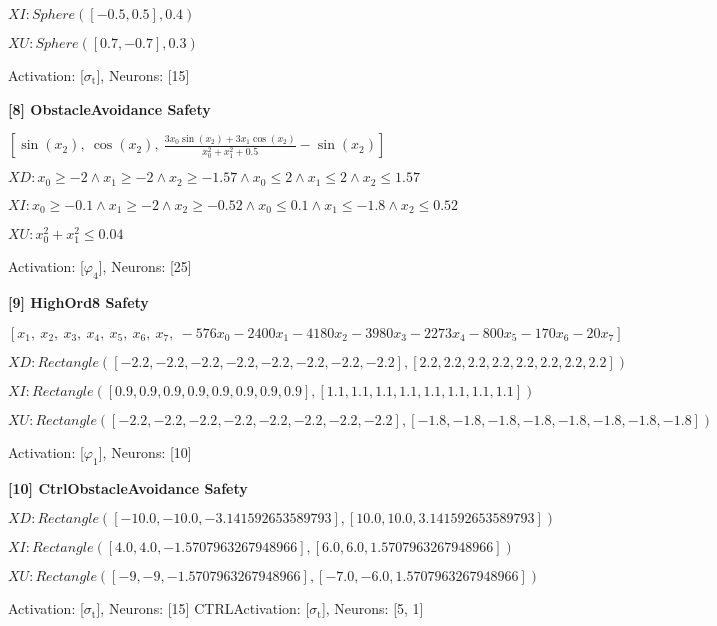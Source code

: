 $XI: Sphere([-0.5, 0.5], 0.4) $

$XU: Sphere([0.7, -0.7], 0.3) $


Activation: [$\sigma_{\mathrm{t}}$], Neurons: [15]

\textbf{ [8] ObstacleAvoidance Safety }

$\left[ \sin{\left(x_{2} \right)}, \  \cos{\left(x_{2} \right)}, \  \frac{3 x_{0} \sin{\left(x_{2} \right)} + 3 x_{1} \cos{\left(x_{2} \right)}}{x_{0}^{2} + x_{1}^{2} + 0.5} - \sin{\left(x_{2} \right)}\right]$ 
 
 $XD: x_{0} \geq -2 \wedge x_{1} \geq -2 \wedge x_{2} \geq -1.57 \wedge x_{0} \leq 2 \wedge x_{1} \leq 2 \wedge x_{2} \leq 1.57 $

$XI: x_{0} \geq -0.1 \wedge x_{1} \geq -2 \wedge x_{2} \geq -0.52 \wedge x_{0} \leq 0.1 \wedge x_{1} \leq -1.8 \wedge x_{2} \leq 0.52 $

$XU: x_{0}^{2} + x_{1}^{2} \leq 0.04 $


Activation: [$\varphi_{4}$], Neurons: [25]

\textbf{ [9] HighOrd8 Safety }

$\left[ x_{1}, \  x_{2}, \  x_{3}, \  x_{4}, \  x_{5}, \  x_{6}, \  x_{7}, \  - 576 x_{0} - 2400 x_{1} - 4180 x_{2} - 3980 x_{3} - 2273 x_{4} - 800 x_{5} - 170 x_{6} - 20 x_{7}\right]$ 
 
 $XD: Rectangle([-2.2, -2.2, -2.2, -2.2, -2.2, -2.2, -2.2, -2.2], [2.2, 2.2, 2.2, 2.2, 2.2, 2.2, 2.2, 2.2]) $

$XI: Rectangle([0.9, 0.9, 0.9, 0.9, 0.9, 0.9, 0.9, 0.9], [1.1, 1.1, 1.1, 1.1, 1.1, 1.1, 1.1, 1.1]) $

$XU: Rectangle([-2.2, -2.2, -2.2, -2.2, -2.2, -2.2, -2.2, -2.2], [-1.8, -1.8, -1.8, -1.8, -1.8, -1.8, -1.8, -1.8]) $


Activation: [$\varphi_{1}$], Neurons: [10]

\textbf{ [10] CtrlObstacleAvoidance Safety }

 
 $XD: Rectangle([-10.0, -10.0, -3.141592653589793], [10.0, 10.0, 3.141592653589793]) $

$XI: Rectangle([4.0, 4.0, -1.5707963267948966], [6.0, 6.0, 1.5707963267948966]) $

$XU: Rectangle([-9, -9, -1.5707963267948966], [-7.0, -6.0, 1.5707963267948966]) $


Activation: [$\sigma_{\mathrm{t}}$], Neurons: [15]
CTRLActivation: [$\sigma_{\mathrm{t}}$], Neurons: [5, 1]

